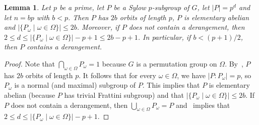 \documentclass[11pt,a4paper]{amsart}
\newtheorem{lemma}[theorem]{Lemma}
\theoremstyle{definition}
\begin{document}
\begin{lemma}\label{NewBounds}
Let $p$ be a prime, let $P$ be a Sylow $p$-subgroup of $G$, let $|P|=p^d$ and let $n=bp$ with $b<p$. Then $P$ has $2b$ orbits of length $p$, $P$ is elementary abelian and $|\{P_\omega\mid\omega\in\Omega\}|\leq 2b$. Moreover, if $P$ does not contain a derangement, then $2\leq d\leq |\{P_\omega\mid\omega\in\Omega\}|-p+1\leq 2b-p+1$. In particular, if $b<(p+1)/2$, then $P$ contains a derangement.
\end{lemma}
\begin{proof}
Note that $\bigcap_{\omega\in\Omega} P_\omega =1$ because $G$ is a permutation group on $\Omega$. By~, $P$ has $2b$ orbits of length $p$. It follows that for every $\omega\in\Omega$, we have $|P:P_\omega|=p$, so $P_\omega$ is a normal (and maximal) subgroup of $P$. This implies that $P$ is elementary abelian (because $P$ has trivial Frattini subgroup) and that $|\{P_\omega\mid\omega\in\Omega\}|\leq 2b$. If $P$ does not contain a derangement, then $\bigcup_{\omega\in\Omega} P_\omega =P$ and~ implies that $2\leq d\leq |\{P_\omega\mid\omega\in\Omega\}|-p+1$. %
\end{proof}
\end{document}
